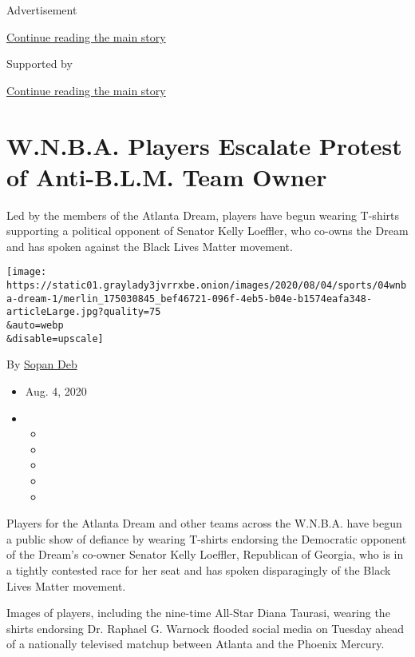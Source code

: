 Advertisement

\protect\hyperlink{after-top}{Continue reading the main story}

Supported by

\protect\hyperlink{after-sponsor}{Continue reading the main story}

\hypertarget{wnba-players-escalate-protest-of-anti-blm-team-owner}{%
\section{W.N.B.A. Players Escalate Protest of Anti-B.L.M. Team
Owner}\label{wnba-players-escalate-protest-of-anti-blm-team-owner}}

Led by the members of the Atlanta Dream, players have begun wearing
T-shirts supporting a political opponent of Senator Kelly Loeffler, who
co-owns the Dream and has spoken against the Black Lives Matter
movement.

\texttt{[image: https://static01.graylady3jvrrxbe.onion/images/2020/08/04/sports/04wnba-dream-1/merlin\_175030845\_bef46721-096f-4eb5-b04e-b1574eafa348-articleLarge.jpg?quality=75\\\&auto=webp\\\&disable=upscale]}

By \href{https://www.nytimes3xbfgragh.onion/by/sopan-deb}{Sopan Deb}

\begin{itemize}
\item
  Aug. 4, 2020
\item
  \begin{itemize}
  \item
  \item
  \item
  \item
  \item
  \end{itemize}
\end{itemize}

Players for the Atlanta Dream and other teams across the W.N.B.A. have
begun a public show of defiance by wearing T-shirts endorsing the
Democratic opponent of the Dream's co-owner Senator Kelly Loeffler,
Republican of Georgia, who is in a tightly contested race for her seat
and has spoken disparagingly of the Black Lives Matter movement.

Images of players, including the nine-time All-Star Diana Taurasi,
wearing the shirts endorsing Dr. Raphael G. Warnock flooded social media
on Tuesday ahead of a nationally televised matchup between Atlanta and
the Phoenix Mercury.

